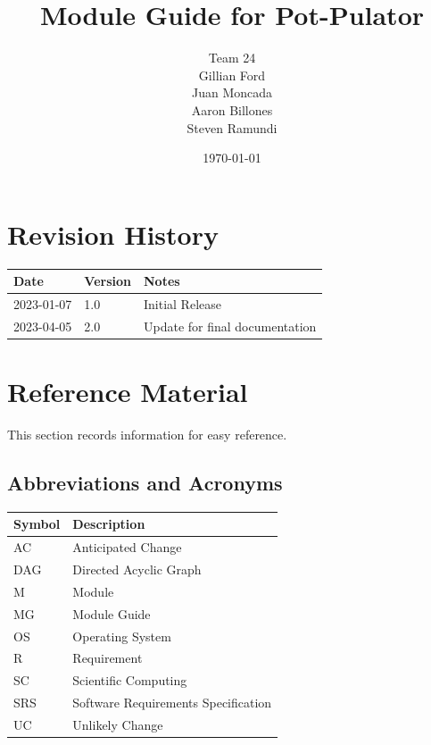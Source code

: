 \documentclass[12pt, titlepage]{article}
\begin{document}
\title{Module Guide for Pot-Pulator} 
\author{Team 24  \\ Gillian Ford\\ Juan Moncada \\ Aaron Billones  \\ Steven Ramundi }
\date{\today}

\maketitle


\section{Revision History}

\begin{tabularx}{\textwidth}{p{3cm}p{2cm}X}
\toprule {\bf Date} & {\bf Version} & {\bf Notes}\\
\midrule
2023-01-07 & 1.0 & Initial Release\\
2023-04-05 & 2.0 & Update for final documentation\\
\bottomrule
\end{tabularx}

\newpage

\section{Reference Material}

This section records information for easy reference.

\subsection{Abbreviations and Acronyms}

\renewcommand{\arraystretch}{1.2}
\begin{tabular}{l l} 
  \toprule		
  \textbf{Symbol} & \textbf{Description}\\
  \midrule 
  AC & Anticipated Change\\
  DAG & Directed Acyclic Graph \\
  M & Module \\
  MG & Module Guide \\
  OS & Operating System \\
  R & Requirement\\
  SC & Scientific Computing \\
  SRS & Software Requirements Specification\\
  UC & Unlikely Change \\
  \bottomrule
\end{tabular}\\
\end{document}
